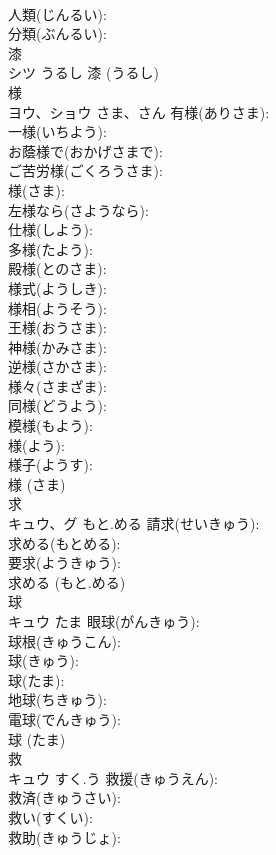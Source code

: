 \documentclass[8pt]{extreport}
\begin{document}
\begin{CJK}{UTF8}{min}
\\	人類(じんるい): 
\\	分類(ぶんるい): 
\\	漆			
\\	シツ	うるし		漆 (うるし)
\\	様			
\\	ヨウ、ショウ	さま、さん	有様(ありさま): 
\\	一様(いちよう): 
\\	お蔭様で(おかげさまで): 
\\	ご苦労様(ごくろうさま): 
\\	様(さま): 
\\	左様なら(さようなら): 
\\	仕様(しよう): 
\\	多様(たよう): 
\\	殿様(とのさま): 
\\	様式(ようしき): 
\\	様相(ようそう): 
\\	王様(おうさま): 
\\	神様(かみさま): 
\\	逆様(さかさま): 
\\	様々(さまざま): 
\\	同様(どうよう): 
\\	模様(もよう): 
\\	様(よう): 
\\	様子(ようす): 
\\	様 (さま)
\\	求			
\\	キュウ、グ	もと.める	請求(せいきゅう): 
\\	求める(もとめる): 
\\	要求(ようきゅう): 
\\	求める (もと.める)
\\	球			
\\	キュウ	たま	眼球(がんきゅう): 
\\	球根(きゅうこん): 
\\	球(きゅう): 
\\	球(たま): 
\\	地球(ちきゅう): 
\\	電球(でんきゅう): 
\\	球 (たま)
\\	救			
\\	キュウ	すく.う	救援(きゅうえん): 
\\	救済(きゅうさい): 
\\	救い(すくい): 
\\	救助(きゅうじょ): 

\end{CJK}
\end{document}
